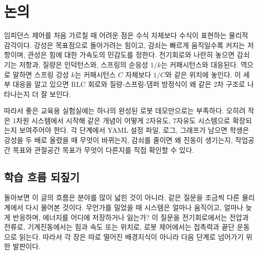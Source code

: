 \section{논의}

임피던스 제어를 처음 가르칠 때 어려운 점은 수식 자체보다 수식이 표현하는 물리적 감각이다.
강성은 목표점으로 돌아가려는 힘이고, 감쇠는 빠르게 움직일수록 커지는 저항이며, 관성은 힘에 대한 가속도의 민감도를 정한다.
전기회로와 나란히 놓으면 감쇠기는 저항과, 질량은 인덕턴스와, 스프링의 순응성 $1/k$는 커패시턴스와 대응된다.
역으로 말하면 스프링 강성 $k$는 커패시턴스 $C$ 자체보다 $1/C$와 같은 위치에 놓인다.
이 세부 대응을 알고 있으면 RLC 회로와 질량-스프링-댐퍼 방정식이 왜 같은 2차 구조로 나타나는지 더 잘 보인다.

따라서 좋은 교육용 실험실에는 하나의 완성된 로봇 데모만으로는 부족하다.
오히려 작은 1차원 시스템에서 시작해 같은 개념이 어떻게 2자유도, 7자유도 시스템으로 확장되는지 보여주어야 한다.
각 단계에서 YAML 설정 파일, 로그, 그래프가 남으면 학생은 강성을 두 배로 올렸을 때 무엇이 바뀌는지, 감쇠를 줄이면 왜 진동이 생기는지, 작업공간 목표와 관절공간 목표가 무엇이 다른지를 직접 확인할 수 있다.

\subsection{학습 흐름 되짚기}

돌아보면 이 글의 흐름은 분야를 많이 넓힌 것이 아니라, 같은 질문을 조금씩 다른 물리계에서 다시 물어본 것이다.
무언가를 밀었을 때 시스템은 얼마나 움직이고, 얼마나 늦게 반응하며, 에너지를 어디에 저장하거나 잃는가?
이 질문을 전기회로에서는 전압과 전류로, 기계진동에서는 힘과 속도 또는 위치로, 로봇 제어에서는 접촉력과 끝단 운동으로 읽는다.
따라서 각 장은 따로 떨어진 배경지식이 아니라 다음 단계로 넘어가기 위한 발판이다.

